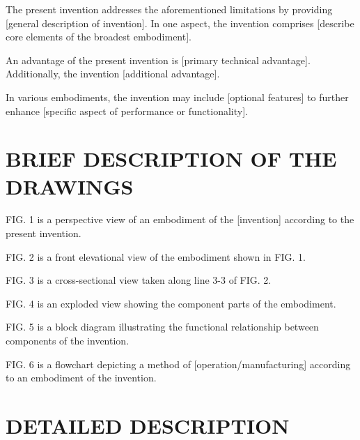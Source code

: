 \documentclass[12pt,letterpaper]{article}
\begin{document}
The present invention addresses the aforementioned limitations by providing [general description of invention]. In one aspect, the invention comprises [describe core elements of the broadest embodiment].

An advantage of the present invention is [primary technical advantage]. Additionally, the invention [additional advantage].

In various embodiments, the invention may include [optional features] to further enhance [specific aspect of performance or functionality].

\section*{BRIEF DESCRIPTION OF THE DRAWINGS}


FIG. 1 is a perspective view of an embodiment of the [invention] according to the present invention.

FIG. 2 is a front elevational view of the embodiment shown in FIG. 1.

FIG. 3 is a cross-sectional view taken along line 3-3 of FIG. 2.

FIG. 4 is an exploded view showing the component parts of the embodiment.

FIG. 5 is a block diagram illustrating the functional relationship between components of the invention.

FIG. 6 is a flowchart depicting a method of [operation/manufacturing] according to an embodiment of the invention.

\section*{DETAILED DESCRIPTION}

\end{document}
